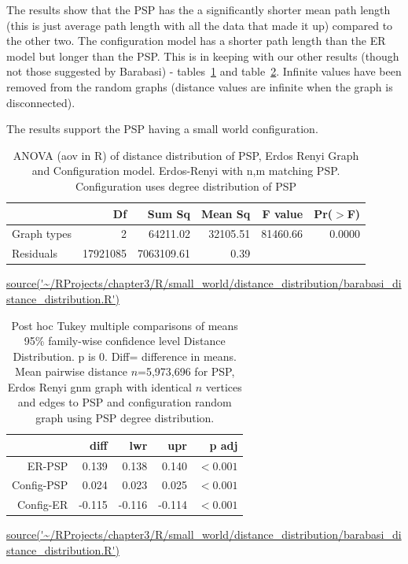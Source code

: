 The results show that the PSP has the a significantly shorter mean path length (this is just average path length with all the data that made it up) compared to the other two. The configuration model has a shorter path length than the ER model but longer than the PSP. This is in keeping with our other results (though not those suggested by Barabasi) - tables~\ref{tab:ANOVA_distance_distribution} and table~\ref{tab:Tukey post hoc}. Infinite values have been removed from the random graphs (distance values are infinite when the graph is disconnected).

The results support the PSP having a small world configuration. 

\begin{table}[ht]
\centering
\begin{tabular}{lrrrrr}
  \toprule
 & Df & Sum Sq & Mean Sq & F value & Pr($>$F) \\ 
  \midrule
Graph types & 2 & 64211.02 & 32105.51 & 81460.66 & 0.0000 \vspace{1mm}\\ 
  Residuals & 17921085 & 7063109.61 & 0.39 &  &  \vspace{1mm}\\ 
   \bottomrule
\end{tabular}
\caption{ANOVA (aov in R) of distance distribution of PSP, Erdos Renyi Graph and Configuration model. Erdos-Renyi with n,m matching PSP. Configuration uses degree distribution of PSP}
\tiny\url{source('~/RProjects/chapter3/R/small_world/distance_distribution/barabasi_distance_distribution.R')}
\label{tab:ANOVA_distance_distribution}
\end{table}
\begin{table}[ht]
\centering
\begin{tabular}{rrrrr}
  \toprule  
 & diff & lwr & upr & p adj \\ 
  \midrule
ER-PSP & 0.139 & 0.138 & 0.140 & $<0.001$ \\ 
  Config-PSP & 0.024 & 0.023 & 0.025 & $<0.001$ \\ 
  Config-ER & -0.115 & -0.116 & -0.114 & $<0.001$ \\ 
   \bottomrule
\end{tabular}
\caption[Tukey Distance Distribution]{Post hoc  Tukey multiple comparisons of means
    95\% family-wise confidence level Distance Distribution. p is 0. Diff= difference in means. Mean pairwise distance $n$=5,973,696 for PSP, Erdos Renyi gnm graph with identical $n$ vertices and edges to PSP and configuration random graph using PSP degree distribution. }
\tiny\url{source('~/RProjects/chapter3/R/small_world/distance_distribution/barabasi_distance_distribution.R')}
\label{tab:Tukey post hoc}
\end{table}


